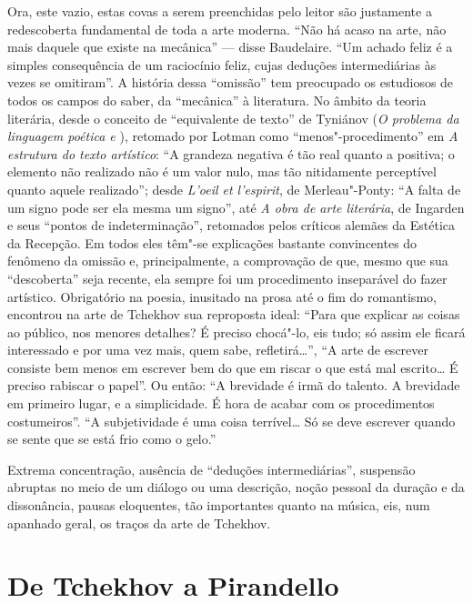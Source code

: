 Ora, este vazio, estas covas a serem preenchidas pelo leitor são
justamente a redescoberta fundamental de toda a arte moderna. ``Não há
acaso na arte, não mais daquele que existe na mecânica'' --- disse
Baudelaire. ``Um achado feliz é a simples consequência de um raciocínio
feliz, cujas deduções intermediárias às vezes se omitiram''. A história
dessa ``omissão'' tem preocupado os estudiosos de todos os campos do
saber, da ``mecânica'' à literatura. No âmbito da teoria literária,
desde o conceito de ``equivalente de texto'' de Tyniánov (\emph{O
problema da linguagem poética  e }), retomado por Lotman como
``menos"-procedimento'' em \emph{A estrutura do texto artístico}: ``A
grandeza negativa é tão real quanto a positiva; o elemento não realizado
não é um valor nulo, mas tão nitidamente perceptível quanto aquele
realizado''; desde \emph{L'oeil et l'espirit}, de Merleau"-Ponty: ``A
falta de um signo pode ser ela mesma um signo'', até \emph{A obra de
arte literária}, de Ingarden e seus ``pontos de indeterminação'',
retomados pelos críticos alemães da Estética da Recepção. Em todos eles têm"-se
explicações bastante convincentes do fenômeno da omissão e, principalmente, a
comprovação de que, mesmo que sua ``descoberta'' seja recente, ela
sempre foi um procedimento inseparável do fazer artístico. Obrigatório
na poesia, inusitado na prosa até o fim do romantismo, encontrou na arte
de Tchekhov sua reproposta ideal: ``Para que explicar as coisas ao
público, nos menores detalhes? É preciso chocá"-lo, eis tudo; só assim
ele ficará interessado e por uma vez mais, quem sabe, refletirá\ldots{}'', ``A
arte de escrever consiste bem menos em escrever bem do que em riscar o
que está mal escrito\ldots{} É preciso rabiscar o papel''. Ou então: ``A
brevidade é irmã do talento. A brevidade em primeiro lugar, e a
simplicidade. É hora de acabar com os procedimentos costumeiros''. ``A
subjetividade é uma coisa terrível\ldots{} Só se deve escrever quando se
sente que se está frio como o gelo.''

Extrema concentração, ausência de ``deduções intermediárias'', suspensão
abruptas no meio de um diálogo ou uma descrição, noção pessoal da
duração e da dissonância, pausas eloquentes, tão importantes quanto na
música, eis, num apanhado geral, os traços da arte de Tchekhov.


\chapter{De Tchekhov a Pirandello}

